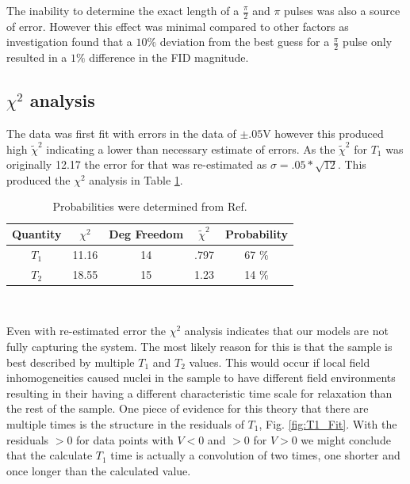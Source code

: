 \documentclass[11pt,letterpaper]{article}
\begin{document}
 The inability to determine the exact length of a $\frac{\pi}{2}$ and $\pi$ pulses was also a source of error. However this effect was minimal compared to other factors as investigation found that a $10\%$ deviation from the best guess for a $\frac{\pi}{2}$ pulse only resulted in a $1\%$ difference in the FID magnitude.
\subsection{$\chi^2$ analysis}
\label{sec:ChiSq}
The data was first fit with errors in the data of $\pm .05$V however this produced high $\tilde{\chi}^2$ indicating a lower than necessary estimate of errors. As the $\tilde{\chi}^2$ for $T_1$ was originally 12.17 the error for that was re-estimated as $\sigma=.05*\sqrt{12}$. This produced the $\chi^2$ analysis in Table \ref{table:ChiSq}.

\begin{table}[!h]

	\begin{center}
		\begin{tabular}{|c|c|c|c|c|} \hline
			Quantity & $\chi^2$&Deg Freedom&$\tilde{\chi}^2$  &  Probability \\ \hline \hline
			$T_1$ & 11.16 & 14 & .797 &  67 \%   \\ \hline
			$T_2$ & 18.55 & 15 & 1.23 & 14 \%   \\ \hline
		\end{tabular} \\
		\caption{Probabilities were determined from Ref. \cite{TaylorError}}
        \label{table:ChiSq}
	\end{center}
\end{table}


Even with re-estimated error the $\chi^2$ analysis indicates that our models are not fully capturing the system. The most likely reason for this is that the sample is best described by multiple $T_1$ and $T_2$ values. This would occur if local field inhomogeneities caused nuclei in the sample to have different field environments resulting in their having a different characteristic time scale for relaxation than the rest of the sample. One piece of evidence for this theory that there are multiple times is the structure in the residuals of $T_1$, Fig. \ref{fig:T1_Fit}. With the residuals $>0$ for data points with $V<0$ and $>0$ for $V>0$ we might conclude that the calculate $T_1$ time is actually a convolution of two times, one shorter and once longer than the calculated value. 
\end{document}
